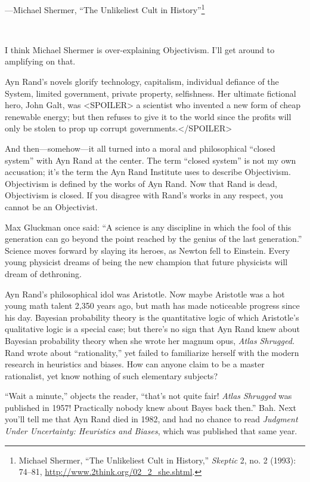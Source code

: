 {\raggedleft
 {}---Michael Shermer, ``The Unlikeliest Cult in
History''\footnote{Michael Shermer, ``The Unlikeliest Cult in
History,'' \textit{Skeptic} 2, no. 2 (1993): 74--81,
\url{http://www.2think.org/02\_2\_she.shtml}.}
\par}


\bigskip

{
 ~}

{
 I think Michael Shermer is over-explaining Objectivism.
I'll get around to amplifying on that.}

{
 Ayn Rand's novels glorify technology, capitalism,
individual defiance of the System, limited government, private
property, selfishness. Her ultimate fictional hero, John Galt, was
{\textless}SPOILER{\textgreater} a scientist who invented a new form of
cheap renewable energy; but then refuses to give it to the world since
the profits will only be stolen to prop up corrupt
governments.{\textless}/SPOILER{\textgreater}}

{
 And then---somehow---it all turned into a moral and philosophical
``closed system'' with Ayn Rand at
the center. The term ``closed
system'' is not my own accusation;
it's the term the Ayn Rand Institute uses to describe
Objectivism. Objectivism is defined by the works of Ayn Rand. Now that
Rand is dead, Objectivism is closed. If you disagree with
Rand's works in any respect, you cannot be an
Objectivist.}

{
 Max Gluckman once said: ``A science is any
discipline in which the fool of this generation can go beyond the point
reached by the genius of the last generation.''
Science moves forward by slaying its heroes, as Newton fell to
Einstein. Every young physicist dreams of being the new champion that
future physicists will dream of dethroning.}

{
 Ayn Rand's philosophical idol was Aristotle. Now
maybe Aristotle was a hot young math talent 2,350 years ago, but math
has made noticeable progress since his day. Bayesian probability theory
is the quantitative logic of which Aristotle's
qualitative logic is a special case; but there's no
sign that Ayn Rand knew about Bayesian probability theory when she
wrote her magnum opus, \textit{Atlas Shrugged.} Rand wrote about
``rationality,'' yet failed to
familiarize herself with the modern research in heuristics and biases.
How can anyone claim to be a master rationalist, yet know nothing of
such elementary subjects?}

{
 ``Wait a minute,'' objects the
reader, ``that's not quite fair!
\textit{Atlas Shrugged} was published in 1957! Practically nobody knew
about Bayes back then.'' Bah. Next
you'll tell me that Ayn Rand died in 1982, and had no
chance to read \textit{Judgment Under Uncertainty: Heuristics and
Biases}, which was published that same year.}

